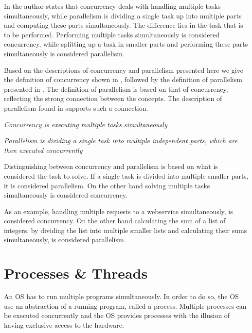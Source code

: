 In \cite[p. 24]{sevenModels} the author states that concurrency deals with handling multiple tasks simultaneously, while parallelism is dividing a single task up into multiple parts and computing these parts simultaneously. The difference lies in the task that is to be performed. Performing multiple tasks simultaneously is considered concurrency, while splitting up a task in smaller parts and performing these parts simultaneously is considered parallelism.

Based on the descriptions of concurrency and parallelism presented here we give the definition of concurrency shown in , followed by the definition of parallelism presented in . The definition of parallelism is based on that of concurrency, reflecting the strong connection between the concepts. The description of parallelism found in \cite{introPar} supports such a connection.
\begin{defn}\label{def:concurrency}
\emph{Concurrency is executing multiple tasks simultaneously}
\end{defn}

\begin{defn}\label{def:parallelism}
\emph{Parallelism is dividing a single task into multiple independent parts, which are then executed concurrently}
\end{defn}
Distinguishing between concurrency and parallelism is based on what is considered the task to solve. If a single task is divided into multiple smaller parts, it is considered parallelism. On the other hand solving multiple tasks simultaneously is considered concurrency.

As an example, handling multiple requests to a webservice simultaneously, is considered concurrency. On the other hand calculating the sum of a list of integers, by dividing the list into multiple smaller lists and calculating their sums simultaneously, is considered parallelism.

\section{Processes \& Threads}\label{sec:processes_threads}
An \ac{OS} has to run multiple programs simultaneously. In order to do so, the \ac{OS} use an abstraction of a running program, called a process\cite[p. 81]{tanenbaum2008modern}\cite[p. 16]{bryant2011computer}. Multiple processes can be executed concurrently and the \ac{OS} provides processes with the illusion of having exclusive access to the hardware\cite[p. 16]{bryant2011computer}. 

